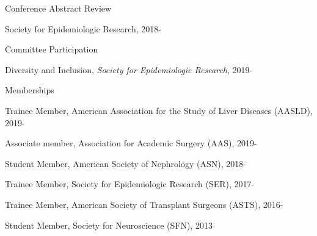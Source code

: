 \documentclass[10pt]{article}
\renewcommand{\section}[1]{\pagebreak[3]%
    \vspace{1.3\baselineskip}%
    \phantomsection\addcontentsline{toc}{section}{#1}%
    \noindent\llap{\scshape\smash{\parbox[t]{\marginparwidth}{\hyphenpenalty=10000\raggedright #1}}}%
    \vspace{-\baselineskip}\par}
\begin{document}
\vspace{2mm}

Conference Abstract Review

\begin{innerlist}

\item Society for Epidemiologic Research, 2018-

\end{innerlist}

\vspace{2mm}

Committee Participation

\begin{innerlist}

\item Diversity and Inclusion, \emph{Society for Epidemiologic Research}, 2019-

\end{innerlist}

\vspace{2mm}

Memberships

\begin{innerlist}

\item Trainee Member, American Association for the Study of
  Liver Diseases (AASLD), 2019-
\item Associate member, Association for Academic Surgery (AAS), 2019-
\item Student Member, American Society of Nephrology (ASN), 2018-
\item Trainee Member, Society for Epidemiologic Research (SER), 2017-
\item Trainee Member, American Society of Transplant Surgeons (ASTS), 2016-
\item Student Member, Society for Neuroscience (SFN), 2013

\end{innerlist}

\end{document}
